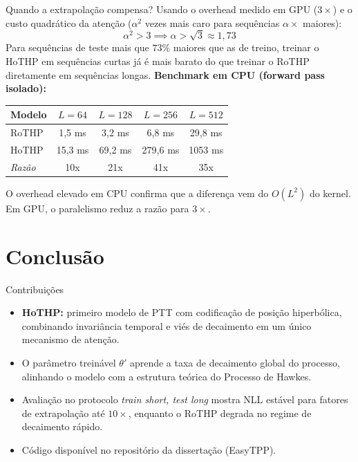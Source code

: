 \documentclass[aspectratio=169]{beamer}
\begin{document}
\begin{frame}{Quando a extrapolação compensa?}
  Usando o overhead medido em GPU ($3\times$) e o custo quadrático da atenção
  ($\alpha^2$ vezes mais caro para sequências $\alpha\times$ maiores):
  \[
    \alpha^2 > 3 \implies \alpha > \sqrt{3} \approx 1{,}73
  \]
  Para sequências de teste mais que $73\%$ maiores que as de treino,
  treinar o HoTHP em sequências curtas já é mais barato do que treinar
  o RoTHP diretamente em sequências longas.
  \textbf{Benchmark em CPU (forward pass isolado):}
  \vspace{0.3em}

  {\small
  \begin{tabular}{lcccc}
    \toprule
    \textbf{Modelo} & $L=64$ & $L=128$ & $L=256$ & $L=512$ \\
    \midrule
    RoTHP  & 1,5 ms & 3,2 ms & 6,8 ms & 29,8 ms \\
    HoTHP  & 15,3 ms & 69,2 ms & 279,6 ms & 1053 ms \\
    \textit{Razão} & 10x & 21x & 41x & 35x \\
    \bottomrule
  \end{tabular}
  }

  \vspace{0.3em}
  O overhead elevado em CPU confirma que a diferença vem do $O(L^2)$ do kernel.
  Em GPU, o paralelismo reduz a razão para $3\times$.
\end{frame}

\section{Conclusão}

\begin{frame}{Contribuições}
  \begin{itemize}
    \item \textbf{HoTHP:} primeiro modelo de PTT com codificação de posição
          hiperbólica, combinando invariância temporal e viés de decaimento
          em um único mecanismo de atenção.
    \item O parâmetro treinável $\theta'$ aprende a taxa de decaimento
          global do processo, alinhando o modelo com a estrutura teórica
          do Processo de Hawkes.
    \item Avaliação no protocolo \emph{train short, test long} mostra NLL
          estável para fatores de extrapolação até $10\times$, enquanto
          o RoTHP degrada no regime de decaimento rápido.
    \item Código disponível no repositório da dissertação (EasyTPP).
  \end{itemize}
\end{frame}
\end{document}

